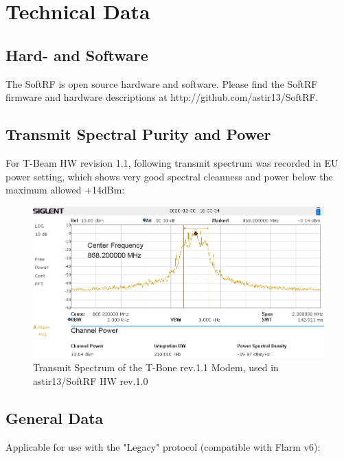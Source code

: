 \documentclass[11pt,a4paper]{article}
\begin{document}
\section{Technical Data}

\subsection{Hard- and Software}
The SoftRF is open source hardware and software. Please find the SoftRF firmware and hardware descriptions at http://github.com/astir13/SoftRF.

\subsection{Transmit Spectral Purity and Power}
For T-Beam HW revision 1.1, following transmit spectrum was recorded in EU power setting, which shows very good spectral cleanness and power below the maximum allowed +14dBm:

\begin{figure}[h]
\centering
\includegraphics[scale=.5]{spectrum.png}
\caption{Transmit Spectrum of the T-Bone rev.\/1.1 Modem, used in astir13/SoftRF HW rev.\/1.0}\label{spectrum}
\end{figure}\FloatBarrier


\subsection{General Data}
Applicable for use with the "Legacy" protocol (compatible with Flarm v6):
\end{document}

